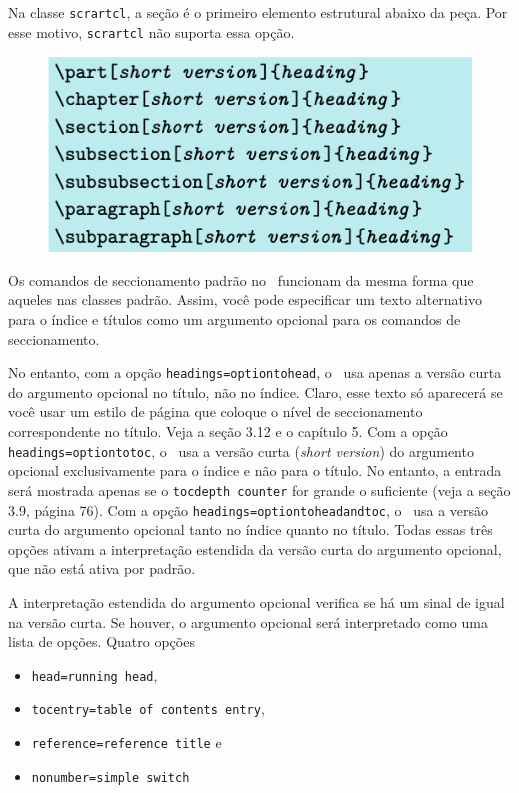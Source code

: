 Na classe \texttt{scrartcl}, a seção é o primeiro elemento estrutural abaixo da peça. Por esse motivo, \texttt{scrartcl} não suporta essa opção.

\begin{figure}
    \centering
    \includegraphics[width=0.5\linewidth]{imagens/imagem18.png}
    \label{fig:img18}
\end{figure}

Os comandos de seccionamento padrão no \KOMAScript\ funcionam da mesma forma que aqueles nas classes padrão. Assim, você pode especificar um texto alternativo para o índice e títulos como um argumento opcional para os comandos de seccionamento.

No entanto, com a opção \texttt{headings=optiontohead}, o \KOMAScript\ usa apenas a versão curta do argumento opcional no título, não no índice. Claro, esse texto só aparecerá se você usar um estilo de página que coloque o nível de seccionamento correspondente no título. Veja a seção 3.12 e o capítulo 5. Com a opção \texttt{headings=optiontotoc}, o \KOMAScript\ usa a versão curta (\textit{short version}) do argumento opcional exclusivamente para o índice e não para o título. No entanto, a entrada será mostrada apenas se o \texttt{tocdepth counter} for grande o suficiente (veja a seção 3.9, página 76). Com a opção \texttt{headings=optiontoheadandtoc}, o \KOMAScript\ usa a versão curta do argumento opcional tanto no índice quanto no título. Todas essas três opções ativam a interpretação estendida da versão curta do argumento opcional, que não está ativa por padrão.

A interpretação estendida do argumento opcional verifica se há um sinal de igual na versão curta. Se houver, o argumento opcional será interpretado como uma lista de opções. Quatro opções
\begin{itemize}
    \item \texttt{head=running head},
    \item \texttt{tocentry=table of contents entry},
    \item \texttt{reference=reference title} e 
    \item \texttt{nonumber=simple switch}
\end{itemize}

